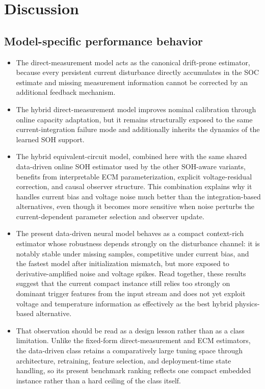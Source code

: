 \documentclass[review,nopreprintline]{elsarticle}
\begin{document}
\section{Discussion}
\subsection{Model-specific performance behavior}
\begin{itemize}[leftmargin=*]
    \item The direct-measurement model acts as the canonical drift-prone estimator, because every persistent current disturbance directly accumulates in the SOC estimate and missing measurement information cannot be corrected by an additional feedback mechanism.
    \item The hybrid direct-measurement model improves nominal calibration through online capacity adaptation, but it remains structurally exposed to the same current-integration failure mode and additionally inherits the dynamics of the learned SOH support.
    \item The hybrid equivalent-circuit model, combined here with the same shared data-driven online SOH estimator used by the other SOH-aware variants, benefits from interpretable ECM parameterization, explicit voltage-residual correction, and causal observer structure. This combination explains why it handles current bias and voltage noise much better than the integration-based alternatives, even though it becomes more sensitive when noise perturbs the current-dependent parameter selection and observer update.
    \item The present data-driven neural model behaves as a compact context-rich estimator whose robustness depends strongly on the disturbance channel: it is notably stable under missing samples, competitive under current bias, and the fastest model after initialization mismatch, but more exposed to derivative-amplified noise and voltage spikes. Read together, these results suggest that the current compact instance still relies too strongly on dominant trigger features from the input stream and does not yet exploit voltage and temperature information as effectively as the best hybrid physics-based alternative.
    \item That observation should be read as a design lesson rather than as a class limitation. Unlike the fixed-form direct-measurement and ECM estimators, the data-driven class retains a comparatively large tuning space through architecture, retraining, feature selection, and deployment-time state handling, so its present benchmark ranking reflects one compact embedded instance rather than a hard ceiling of the class itself.
\end{itemize}
\end{document}
